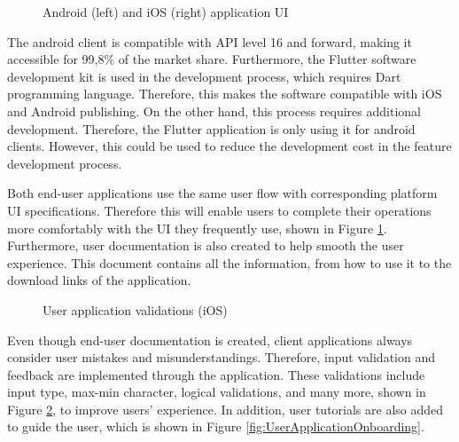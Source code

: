 \begin{figure}[htbp]
\centering
{}
\caption{Android (left) and iOS (right) application UI}
\label{fig:UserApplicationUI}
\end{figure}

The android client is compatible with API level 16 and forward, making it accessible for 99,8\% of the market share. Furthermore, the Flutter software development kit is used in the development process, which requires Dart programming language. Therefore, this makes the software compatible with iOS and Android publishing. On the other hand, this process requires additional development. Therefore, the Flutter application is only using it for android clients. However, this could be used to reduce the development cost in the feature development process.

Both end-user applications use the same user flow with corresponding platform UI specifications. Therefore this will enable users to complete their operations more comfortably with the UI they frequently use, shown in Figure \ref{fig:UserApplicationUI}. Furthermore, user documentation is also created to help smooth the user experience. This document contains all the information, from how to use it to the download links of the application. 

\begin{figure}[htbp]
\centering
{}
\caption{User application validations (iOS)}
\label{fig:UserApplicationValidations}
\end{figure}

Even though end-user documentation is created, client applications always consider user mistakes and misunderstandings. Therefore, input validation and feedback are implemented through the application. These validations include input type, max-min character, logical validations, and many more, shown in Figure \ref{fig:UserApplicationValidations}, to improve users' experience. In addition, user tutorials are also added to guide the user, which is shown in Figure \ref{fig:UserApplicationOnboarding}.

